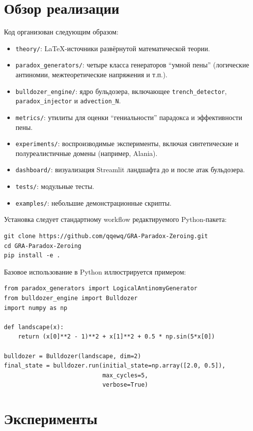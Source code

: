 \documentclass[11pt]{article}
\begin{document}
\section{Обзор реализации}

Код организован следующим образом:
\begin{itemize}
    \item \texttt{theory/}: LaTeX-источники развёрнутой математической теории.
    \item \texttt{paradox\_generators/}: четыре класса генераторов ``умной пены'' (логические антиномии, межтеоретические напряжения и т.п.).
    \item \texttt{bulldozer\_engine/}: ядро бульдозера, включающее \texttt{trench\_detector}, \texttt{paradox\_injector} и \texttt{advection\_N}.
    \item \texttt{metrics/}: утилиты для оценки ``гениальности'' парадокса и эффективности пены.
    \item \texttt{experiments/}: воспроизводимые эксперименты, включая синтетические и полуреалистичные домены (например, Alania).
    \item \texttt{dashboard/}: визуализация Streamlit ландшафта до и после атак бульдозера.
    \item \texttt{tests/}: модульные тесты.
    \item \texttt{examples/}: небольшие демонстрационные скрипты.
\end{itemize}

Установка следует стандартному workflow редактируемого Python-пакета:
\begin{verbatim}
git clone https://github.com/qqewq/GRA-Paradox-Zeroing.git
cd GRA-Paradox-Zeroing
pip install -e .
\end{verbatim}
Базовое использование в Python иллюстрируется примером:
\begin{verbatim}
from paradox_generators import LogicalAntinomyGenerator
from bulldozer_engine import Bulldozer
import numpy as np

def landscape(x):
    return (x[0]**2 - 1)**2 + x[1]**2 + 0.5 * np.sin(5*x[0])

bulldozer = Bulldozer(landscape, dim=2)
final_state = bulldozer.run(initial_state=np.array([2.0, 0.5]),
                            max_cycles=5,
                            verbose=True)
\end{verbatim}

\section{Эксперименты}
\end{document}
